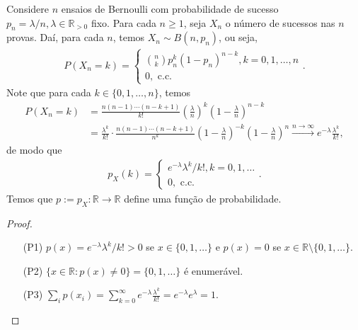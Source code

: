 \documentclass[../Notas.tex]{subfiles}
\begin{document}
\begin{example}
Considere $n$ ensaios de Bernoulli com probabilidade de sucesso $p_n = \lambda/n, \lambda\in\mathbb{R}_{>0}$ fixo. Para cada $n\geq 1$, seja $X_n$ o número de sucessos nas $n$ provas. Daí, para cada $n$, temos $X_n\sim B(n, p_n)$, ou seja,
\begin{align*}
    P(X_n=k) = \begin{cases}
    \binom{n}{k}p_n^k(1-p_n)^{n-k}, k = 0, 1, \dots, n \\
    0, \text{ c.c.}
    \end{cases}.
\end{align*}
Note que para cada $k\in\{0,1,\dots, n\}$, temos
\begin{align*}
    P(X_n = k) &= \frac{n(n-1)\cdots (n-k+1)}{k!}\left(\frac{\lambda}{n}\right)^k\left(1-\frac{\lambda}{n}\right)^{n-k} \\
    &= \frac{\lambda^k}{k!}\cdot\frac{n(n-1)\cdots (n-k+1)}{n^k}\left(1-\frac{\lambda}{n}\right)^{-k}\left(1-\frac{\lambda}{n}\right)^n\xrightarrow{n\to\infty}e^{-\lambda}\frac{\lambda^k}{k!},
\end{align*}
de modo que
\begin{align*}
    p_X(k) = \begin{cases}
    e^{-\lambda}\lambda^k/k!, k = 0, 1, \dots \\
    0, \text{ c.c.}
    \end{cases}.
\end{align*}
Temos que $p:=p_X:\mathbb{R}\to\mathbb{R}$ define uma função de probabilidade.
\begin{proof}
\begin{itemize}
    \item[(P1)] $p(x) = e^{-\lambda}\lambda^k/k! > 0$ se $x\in\{0, 1, \dots\}$ e $p(x) = 0$ se $x\in\mathbb{R}\setminus\{0, 1, \dots\}$.
    \item[(P2)] $\{ x\in\mathbb{R} : p(x) \neq 0 \} = \{ 0, 1, \dots \}$ é enumerável.
    \item[(P3)] $\displaystyle{ \sum_i p(x_i) = \sum_{k=0}^{\infty}e^{-\lambda}\frac{\lambda^k}{k!} = e^{-\lambda}e^{\lambda} = 1}.$
\end{itemize}
\end{proof}
\end{example}
\end{document}
